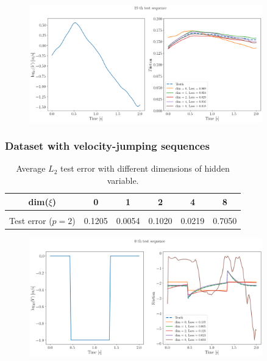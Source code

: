 \begin{figure}[H]
    \centering
    \includegraphics[width=0.9\textwidth]{images/dtTSqBurigede2_fixed.png}
    \label{fig:dtTSqBurigede2Fixed}
\end{figure}
\subsubsection{Dataset with velocity-jumping sequences}
\begin{table}[H]
    \centering
    \begin{tabular}{c|ccccc}
        \hline
        dim($\xi$) & 0 & 1 & 2 & 4 & 8\\
        \hline \\[-1em]
        Test error ($p=2$) & 0.1205  & 0.0054 & 0.1020 & 0.0219 & 0.7050\\
        \hline
    \end{tabular}
    \caption{Average $L_2$ test error with different dimensions of hidden variable.}
    \label{tab:resDtTSqJumpFixed}
\end{table}
\begin{figure}[H]
    \centering
    \includegraphics[width=0.9\textwidth]{images/dtTSqJump1_fixed.png}
    \label{fig:dtTSqJump1Fixed}
\end{figure}

